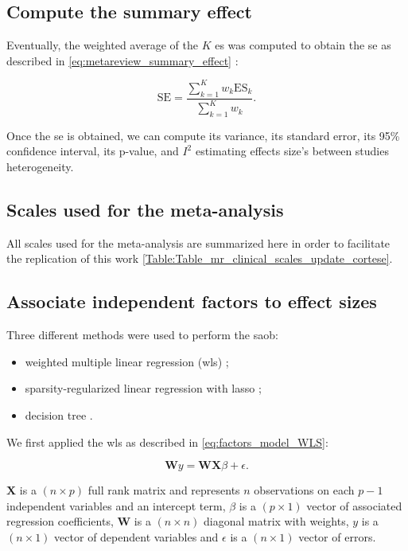 \documentclass[12pt,a4paper,english]{article}
\begin{document}
\subsection{Compute the summary effect}

Eventually, the weighted average of the $K$ \gls{es} was computed to obtain the \gls{se} as described in 
\ref{eq:metareview_summary_effect} \citep{Borenstein2009}:

\begin{equation}
\label{eq:metareview_summary_effect}
\text{SE} = \frac{\sum_{k=1}^{K} w_k \text{ES}_k} {\sum_{k=1}^{K} w_k}.
\end{equation} 

Once the \gls{se}  is obtained, we can compute its variance, its standard error, its 95\% confidence interval, its p-value, 
and $I^2$ estimating effects size's between studies heterogeneity. 

\subsection{Scales used for the meta-analysis}

All scales used for the meta-analysis are summarized here in order to facilitate the replication of this work \ref{Table:Table_mr_clinical_scales_update_cortese}.

\subsection{Associate independent factors to effect sizes}

Three different methods were used to perform the \gls{saob}:
\begin{itemize}
	\item weighted multiple linear regression (\gls{wls}) \citep{Montgomery2012}; 
	\item sparsity-regularized linear regression with \gls{lasso} \citep{Tibshirani1996};
	\item decision tree \citep{Quinlan1986}.
\end{itemize}

We first applied the \gls{wls} as described in \ref{eq:factors_model_WLS}: 

\begin{equation}
\label{eq:factors_model_WLS}
\textbf{W}y = \textbf{WX}\beta + \epsilon.
\end{equation}

$\textbf{X}$ is a $(n \times p)$ full rank matrix and represents $n$ observations on each $p-1$ independent variables and an 
intercept term, $\beta$ is a $(p \times 1)$ vector of associated regression coefficients, $\textbf{W}$ is a $(n \times n)$ diagonal 
matrix with weights, $y$ is a $(n \times 1)$ vector of dependent variables and $\epsilon$ is a $(n \times 1)$ vector of errors.
\end{document}
